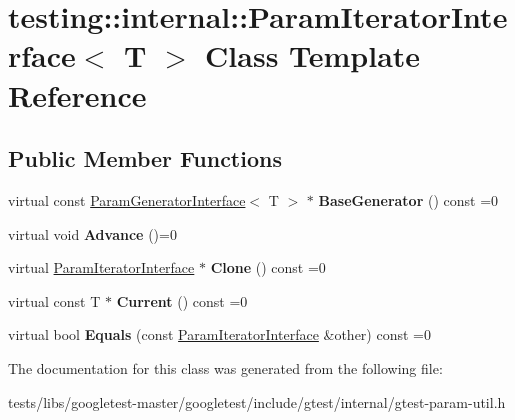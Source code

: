 \hypertarget{classtesting_1_1internal_1_1ParamIteratorInterface}{}\section{testing\+:\+:internal\+:\+:Param\+Iterator\+Interface$<$ T $>$ Class Template Reference}
\label{classtesting_1_1internal_1_1ParamIteratorInterface}
\subsection*{Public Member Functions}
\begin{DoxyCompactItemize}
\item 
\mbox{\label{classtesting_1_1internal_1_1ParamIteratorInterface_a17500953df75ecda1ace46c08ff731e9}} 
virtual const \hyperlink{classtesting_1_1internal_1_1ParamGeneratorInterface}{Param\+Generator\+Interface}$<$ T $>$ $\ast$ {\bfseries Base\+Generator} () const =0
\item 
\mbox{\label{classtesting_1_1internal_1_1ParamIteratorInterface_a600dbd35fcb551463e379516a1abea48}} 
virtual void {\bfseries Advance} ()=0
\item 
\mbox{\label{classtesting_1_1internal_1_1ParamIteratorInterface_a4998c23e27e2943d97546011aa35db80}} 
virtual \hyperlink{classtesting_1_1internal_1_1ParamIteratorInterface}{Param\+Iterator\+Interface} $\ast$ {\bfseries Clone} () const =0
\item 
\mbox{\label{classtesting_1_1internal_1_1ParamIteratorInterface_adfff808576d929085679c315b255af7e}} 
virtual const T $\ast$ {\bfseries Current} () const =0
\item 
\mbox{\label{classtesting_1_1internal_1_1ParamIteratorInterface_a9d811697a752d46f7bd6a0082f9040a3}} 
virtual bool {\bfseries Equals} (const \hyperlink{classtesting_1_1internal_1_1ParamIteratorInterface}{Param\+Iterator\+Interface} \&other) const =0
\end{DoxyCompactItemize}


The documentation for this class was generated from the following file\+:\begin{DoxyCompactItemize}
\item 
tests/libs/googletest-\/master/googletest/include/gtest/internal/gtest-\/param-\/util.\+h\end{DoxyCompactItemize}
